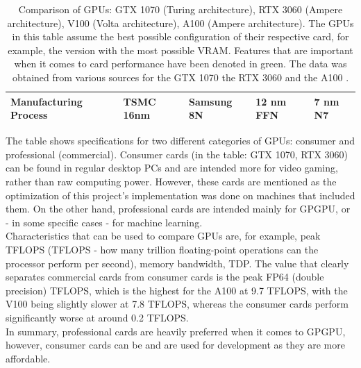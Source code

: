 \begin{table}[h!]
\begin{tabular}{|>{\raggedright\arraybackslash\bfseries\scriptsize}m{2.7cm}|>{\scriptsize}m{2.7cm}|>{\scriptsize}m{2.7cm}|>{\scriptsize}m{2.7cm}|>{\scriptsize}m{2.7cm}|}
		\hline
		Manufacturing Process & TSMC 16nm & Samsung 8N & 12 nm FFN & 7 nm N7\\
		\hline
	\end{tabular}
	\caption{Comparison of GPUs: GTX 1070 (Turing architecture), RTX 3060 (Ampere architecture), V100 (Volta architecture), A100 (Ampere architecture). The GPUs in this table assume the best possible configuration of their respective card, for example, the version with the most possible VRAM. Features that are important when it comes to card performance have been denoted in green. The data was obtained from various sources for the GTX 1070 \cite{Hagedoorn6October2016, oaUUFoT7oI5ApIyY, Smith18May2016, jAnwkq6mMKYTLUOB} the RTX 3060 \cite{Walton7July2021, wGXr33zSUweXiQMY, SMhyh0H3oh3nlda0, May1December2020} and the A100 \cite{soj8qSRbfefUdi8Y, rfiOEXAGDlcAOxF3}.}
	\label{Table:Nvidia-gpu-details-comparison}
\end{table}

The table shows specifications for two different categories of GPUs: consumer and professional (commercial). Consumer cards (in the table: GTX 1070, RTX 3060) can be found in regular desktop PCs and are intended more for video gaming, rather than raw computing power. However, these cards are mentioned as the optimization of this project's implementation was done on machines that included them. On the other hand, professional cards are intended mainly for GPGPU, or - in some specific cases - for machine learning. \\
Characteristics that can be used to compare GPUs are, for example, peak TFLOPS (TFLOPS - how many trillion floating-point operations can the processor perform per second), memory bandwidth, TDP. The value that clearly separates commercial cards from consumer cards is the peak FP64 (double precision) TFLOPS, which is the highest for the A100 at 9.7 TFLOPS, with the V100 being slightly slower at 7.8 TFLOPS, whereas the consumer cards perform significantly worse at around 0.2 TFLOPS. \\
In summary, professional cards are heavily preferred when it comes to GPGPU, however, consumer cards can be and are used for development as they are more affordable.



